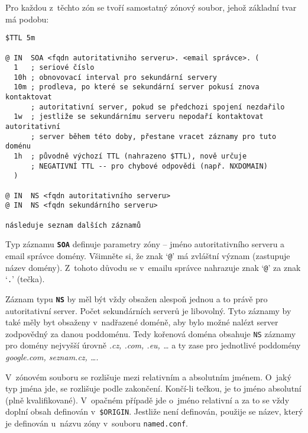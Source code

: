 Pro každou z~těchto zón se tvoří samostatný zónový soubor, jehož základní tvar má podobu:

\begin{verbatim}
$TTL 5m

@ IN  SOA <fqdn autoritativniho serveru>. <email správce>. (
  1   ; seriové číslo
  10h ; obnovovací interval pro sekundární servery
  10m ; prodleva, po které se sekundární server pokusí znova kontaktovat
      ; autoritativní server, pokud se předchozi spojení nezdařilo
  1w  ; jestliže se sekundárnímu serveru nepodaří kontaktovat autoritativní
      ; server během této doby, přestane vracet záznamy pro tuto doménu
  1h  ; původně výchozí TTL (nahrazeno $TTL), nově určuje
      ; NEGATIVNÍ TTL -- pro chybové odpovědi (např. NXDOMAIN)
  )

@ IN  NS <fqdn autoritativního serveru>
@ IN  NS <fqdn sekundárního serveru>

následuje seznam dalších záznamů
\end{verbatim}
Typ záznamu {\tt\bf SOA} definuje parametry zóny -- jméno autoritativního serveru a email správce domény. Všimněte si, že znak `{\tt @}' má zvláštní význam (zastupuje název domény). Z~tohoto důvodu se v~emailu správce nahrazuje znak `{\tt @}' za znak `{\tt .}' (tečka).

Záznam typu {\tt\bf NS} by měl být vždy obsažen alespoň jednou a to právě pro autoritativní server. Počet sekundárních serverů je libovolný. Tyto záznamy by také měly byt obsaženy v~nadřazené doméně, aby bylo možné nalézt server zodpovědný za danou poddoménu. Tedy kořenová doména obsahuje {\tt NS} záznamy pro domény nejvyšší úrovně {\em .cz, .com, .eu, \dots} a ty zase pro jednotlivé poddomény {\em google.com, seznam.cz, \dots}.

V~zónovém souboru se rozlišuje mezi relativním a absolutním jménem. O~jaký typ jména jde, se rozlišuje podle zakončení. Končí-li tečkou, je to jméno absolutní (plně kvalifikované). V~opačném případě jde o~jméno relativní a za to se vždy doplní obsah definován v~{\tt \$ORIGIN}. Jestliže není definován, použije se název, který je definován u~názvu zóny v~souboru {\tt named.conf}.

